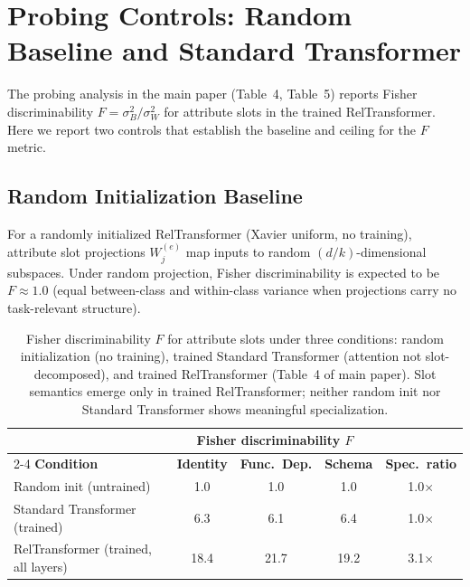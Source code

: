 \documentclass[conference]{IEEEtran}
\begin{document}
\section{Probing Controls: Random Baseline and Standard Transformer}
\label{app:probing}

The probing analysis in the main paper (Table~4, Table~5) reports Fisher discriminability $F = \sigma_B^2 / \sigma_W^2$ for attribute slots in the trained RelTransformer. Here we report two controls that establish the baseline and ceiling for the $F$ metric.

\subsection{Random Initialization Baseline}

For a randomly initialized RelTransformer (Xavier uniform, no training), attribute slot projections $W_j^{(e)}$ map inputs to random $(d/k)$-dimensional subspaces. Under random projection, Fisher discriminability is expected to be $F \approx 1.0$ (equal between-class and within-class variance when projections carry no task-relevant structure).

\begin{table}[tb]
\centering
\caption{Fisher discriminability $F$ for attribute slots under three conditions: random initialization (no training), trained Standard Transformer (attention not slot-decomposed), and trained RelTransformer (Table~4 of main paper). Slot semantics emerge only in trained RelTransformer; neither random init nor Standard Transformer shows meaningful specialization.}
\label{tab:probing_controls}
\begin{tabular}{lcccc}
\toprule
& \multicolumn{3}{c}{\textbf{Fisher discriminability $F$}} & \\
\cmidrule(lr){2-4}
\textbf{Condition} & \textbf{Identity} & \textbf{Func.\ Dep.} & \textbf{Schema} & \textbf{Spec.\ ratio} \\
\midrule
Random init (untrained) & 1.0 & 1.0 & 1.0 & 1.0$\times$ \\
Standard Transformer (trained) & 6.3 & 6.1 & 6.4 & 1.0$\times$ \\
RelTransformer (trained, all layers) & 18.4 & 21.7 & 19.2 & 3.1$\times$ \\
\bottomrule
\end{tabular}%
\end{table}
\end{document}
